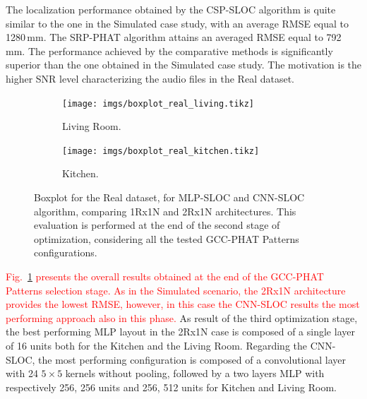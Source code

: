 \documentclass[review]{elsarticle}
\newcommand{\figref}[1]{Fig.~\ref{#1}}
\begin{document}
The localization performance obtained by the CSP-SLOC algorithm is quite similar to the one in the Simulated case study, with an average RMSE equal to 1280\,mm. The SRP-PHAT algorithm attains an averaged RMSE equal to 792\,mm. The performance achieved by the comparative methods is significantly superior than the one obtained in the Simulated case study. The motivation is the higher SNR level characterizing the audio files in the Real dataset.

\begin{figure}[t]
	\centering
	\begin{subfigure}[t]{0.45\textwidth}
	\texttt{[image: imgs/boxplot\_real\_living.tikz]}
	\caption{Living Room.}
	\end{subfigure}
	\begin{subfigure}[t]{0.45\textwidth}
	\texttt{[image: imgs/boxplot\_real\_kitchen.tikz]}
	\caption{Kitchen.}
	\end{subfigure}	
	\caption{Boxplot for the Real dataset, for MLP-SLOC and CNN-SLOC algorithm, comparing 1Rx1N and 2Rx1N architectures. This evaluation is performed at the end of the second stage of optimization, considering all the tested GCC-PHAT Patterns configurations.}
	\label{fig:boxplot_real-mlp}
\end{figure}
\textcolor{red}{\figref{fig:boxplot_real-mlp} presents the overall results obtained at the end of the GCC-PHAT Patterns selection stage. As in the Simulated scenario, the 2Rx1N architecture provides the lowest RMSE, however, in this case the CNN-SLOC results the most performing approach also in this phase.}
As result of the third optimization stage, the best performing MLP layout in the 2Rx1N case is composed of a single layer of 16 units  both for the Kitchen and the Living Room. Regarding the CNN-SLOC,  the most performing configuration is composed of a convolutional layer with 24 $5\times5$ kernels without pooling, followed by a two layers MLP with respectively 256, 256 units and 256, 512 units for Kitchen and Living Room.
\end{document}
